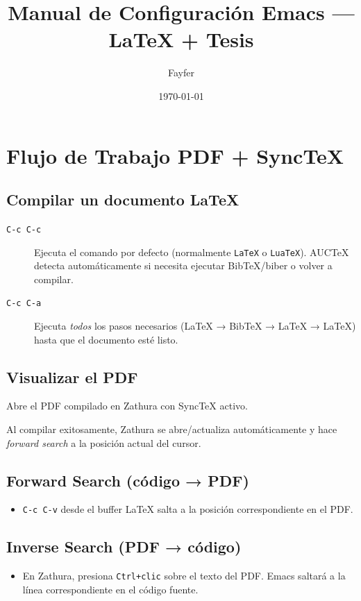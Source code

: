 \documentclass[11pt]{article}
\author{Fayfer}
\date{\today}
\title{Manual de Configuración Emacs — \LaTeX{} + Tesis}
\begin{document}
\maketitle
\setcounter{tocdepth}{3}
\tableofcontents

\section{Flujo de Trabajo PDF + SyncTeX}
\label{sec:orgf0f5c8f}

\subsection{Compilar un documento \LaTeX{}}
\label{sec:org45444fe}
\begin{description}
\item[{\texttt{C-c C-c}}] Ejecuta el comando por defecto (normalmente \texttt{LaTeX} o \texttt{LuaTeX}). AUCTeX detecta automáticamente si necesita ejecutar BibTeX/biber o volver a compilar.
\item[{\texttt{C-c C-a}}] Ejecuta \emph{todos} los pasos necesarios (\LaTeX{} → BibTeX → \LaTeX{} → \LaTeX{}) hasta que el documento esté listo.
\end{description}
\subsection{Visualizar el PDF}
\label{sec:orgc4f0f0d}
\begin{description}
\item[{\texttt{C-c C-v}}] Abre el PDF compilado en Zathura con SyncTeX activo.
\item Al compilar exitosamente, Zathura se abre/actualiza automáticamente y hace \emph{forward search} a la posición actual del cursor.
\end{description}
\subsection{Forward Search (código → PDF)}
\label{sec:orgac193ca}
\begin{itemize}
\item \texttt{C-c C-v} desde el buffer \LaTeX{} salta a la posición correspondiente en el PDF.
\end{itemize}
\subsection{Inverse Search (PDF → código)}
\label{sec:org272dc0b}
\begin{itemize}
\item En Zathura, presiona \texttt{Ctrl+clic} sobre el texto del PDF. Emacs saltará a la línea correspondiente en el código fuente.
\end{itemize}
\end{document}
